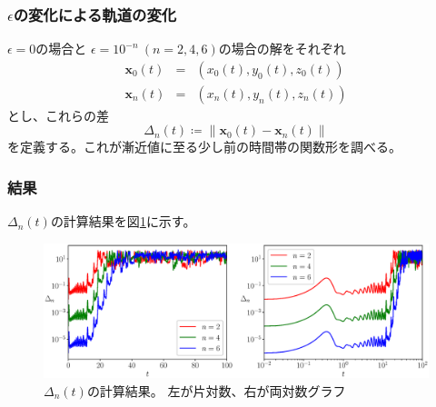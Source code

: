 \documentclass[a4j, titlepage]{jsarticle}
\numberwithin{equation}{section}
\begin{document}
        \subsubsection{$\epsilon$の変化による軌道の変化}
            $\epsilon = 0$の場合と
            $\epsilon = 10^{-n} \ (n = 2, 4, 6)$の場合の解をそれぞれ
            \begin{eqnarray*}
                \bm{x}_0(t) &=& (x_0(t), y_0(t), z_0(t)) \\
                \bm{x}_n(t) &=& (x_n(t), y_n(t), z_n(t))
            \end{eqnarray*}
            とし、これらの差
            \begin{equation*}
                \Delta_n(t) \coloneqq \|\bm{x}_0(t) - \bm{x}_n(t)\|
            \end{equation*}
            を定義する。これが漸近値に至る少し前の時間帯の関数形を調べる。

        \subsubsection{結果}
            $\Delta_n(t)$の計算結果を図\ref{fig:7}に示す。
            \begin{figure}[h]
                \centering
                \includegraphics[width=1\hsize]{kadai7/2.eps}
                \caption{
                    $\Delta_n(t)$の計算結果。
                    左が片対数、右が両対数グラフ
                }
                \label{fig:7}
            \end{figure}
\end{document}
